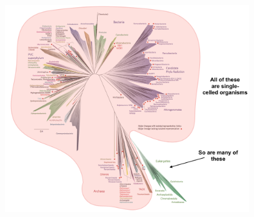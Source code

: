 \documentclass[10pt]{beamer}
\begin{document}
\begin{frame}[t]	

	\begin{center}
		\includegraphics[width=0.8\textwidth]{figures/tree2.png}
	\end{center}
\end{frame}
\end{document}
